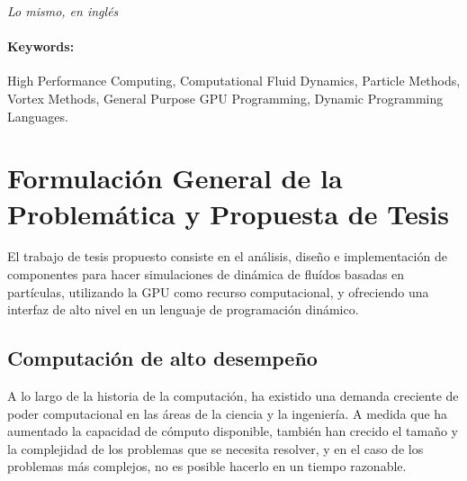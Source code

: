 \documentclass[11pt,spanish]{article}
\begin{document}
\emph{Lo mismo, en inglés}

\paragraph{Keywords:}
High Performance Computing,
Computational Fluid Dynamics,
Particle Methods,
Vortex Methods,
General Purpose GPU Programming,
Dynamic Programming Languages.

\newpage
\section{Formulación General de la Problemática y Propuesta de Tesis}

%    

El trabajo de tesis propuesto consiste en el análisis, diseño e implementación
de componentes para hacer simulaciones de dinámica de fluídos basadas en partículas,
utilizando la GPU como recurso computacional, y ofreciendo una interfaz de alto
nivel en un lenguaje de programación dinámico.

\subsection{Computación de alto desempeño}

A lo largo de la historia de la computación, ha existido una demanda creciente de poder
computacional en las áreas de la ciencia y la ingeniería.  A medida que ha
aumentado la capacidad de cómputo disponible, también han crecido el tamaño y la
complejidad de los problemas que se necesita resolver, y en el caso de los
problemas más complejos, no es posible hacerlo en un tiempo razonable.
\cite{parallel-programming}
\end{document}
